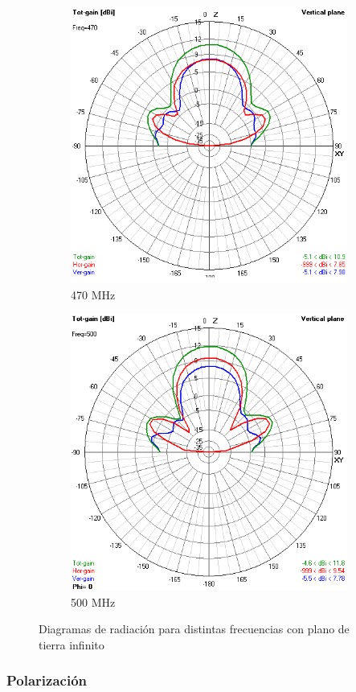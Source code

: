 \documentclass[12pt]{article}
\begin{document}
\begin{figure}[H]
\begin{subfigure}{.48\textwidth}
		\includegraphics[width=.75\linewidth]{helix_1_470.png}
		\caption{470 MHz}
	\end{subfigure}
	\begin{subfigure}{.48\textwidth}
		\centering
		\includegraphics[width=.75\linewidth]{helix_1_500.png}
		\caption{500 MHz}
	\end{subfigure}
	\caption{Diagramas de radiación para distintas frecuencias con plano de tierra infinito}
\end{figure}

\subsubsection*{Polarización}
\end{document}
